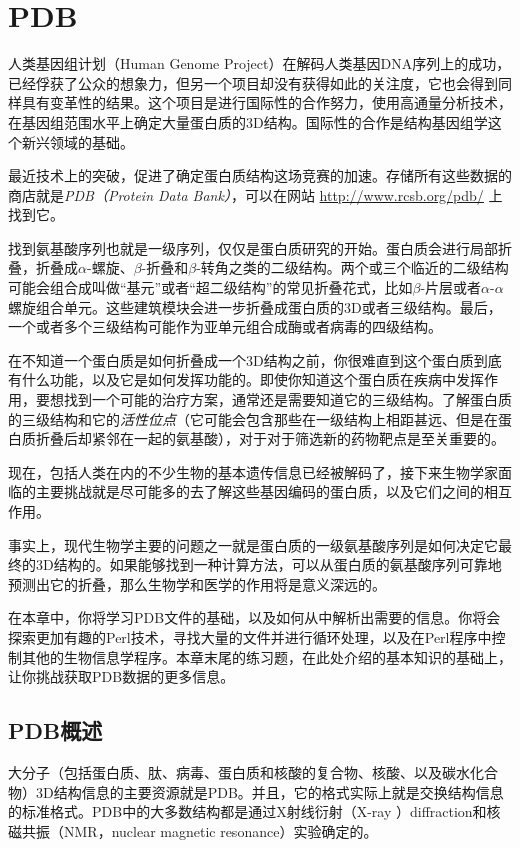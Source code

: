 \chapter{PDB}
\label{chap:chapter11}
\minitoc

人类基因组计划（Human Genome
Project）在解码人类基因DNA序列上的成功，已经俘获了公众的想象力，但另一个项目却没有获得如此的关注度，它也会得到同样具有变革性的结果。这个项目是进行国际性的合作努力，使用高通量分析技术，在基因组范围水平上确定大量蛋白质的3D结构。国际性的合作是结构基因组学这个新兴领域的基础。

最近技术上的突破，促进了确定蛋白质结构这场竞赛的加速。存储所有这些数据的商店就是\textit{PDB（Protein Data Bank）}，可以在网站 \href{http://www.rcsb.org/pdb/}{http://www.rcsb.org/pdb/} 上找到它。

找到氨基酸序列也就是一级序列，仅仅是蛋白质研究的开始。蛋白质会进行局部折叠，折叠成$\alpha$-螺旋、$\beta$-折叠和$\beta$-转角之类的二级结构。两个或三个临近的二级结构可能会组合成叫做“基元”或者“超二级结构”的常见折叠花式，比如$\beta$-片层或者$\alpha$-$\alpha$螺旋组合单元。这些建筑模块会进一步折叠成蛋白质的3D或者三级结构。最后，一个或者多个三级结构可能作为亚单元组合成酶或者病毒的四级结构。

在不知道一个蛋白质是如何折叠成一个3D结构之前，你很难直到这个蛋白质到底有什么功能，以及它是如何发挥功能的。即使你知道这个蛋白质在疾病中发挥作用，要想找到一个可能的治疗方案，通常还是需要知道它的三级结构。了解蛋白质的三级结构和它的\textit{活性位点}（它可能会包含那些在一级结构上相距甚远、但是在蛋白质折叠后却紧邻在一起的氨基酸），对于对于筛选新的药物靶点是至关重要的。

现在，包括人类在内的不少生物的基本遗传信息已经被解码了，接下来生物学家面临的主要挑战就是尽可能多的去了解这些基因编码的蛋白质，以及它们之间的相互作用。

事实上，现代生物学主要的问题之一就是蛋白质的一级氨基酸序列是如何决定它最终的3D结构的。如果能够找到一种计算方法，可以从蛋白质的氨基酸序列可靠地预测出它的折叠，那么生物学和医学的作用将是意义深远的。

在本章中，你将学习PDB文件的基础，以及如何从中解析出需要的信息。你将会探索更加有趣的Perl技术，寻找大量的文件并进行循环处理，以及在Perl程序中控制其他的生物信息学程序。本章末尾的练习题，在此处介绍的基本知识的基础上，让你挑战获取PDB数据的更多信息。

\section{PDB概述}
大分子（包括蛋白质、肽、病毒、蛋白质和核酸的复合物、核酸、以及碳水化合物）3D结构信息的主要资源就是PDB。并且，它的格式实际上就是交换结构信息的标准格式。PDB中的大多数结构都是通过X射线衍射（X-ray ）diffraction和核磁共振（NMR，nuclear magnetic resonance）实验确定的。

